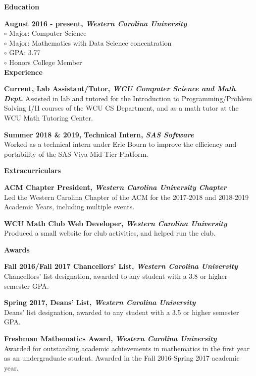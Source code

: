 \documentclass[a4paper,12pt,final]{memoir}
\newcommand{\Sep}{\vspace{1.5em}}
\newcommand{\SmallSep}{\vspace{0.5em}}
\newcommand{\CVSection}[1]
	{\Large\textbf{#1}\par
	\SmallSep\normalsize\normalfont}
\newcommand{\CVItem}[1]
	{\textbf{\color{RoyalBlue} #1}}
\begin{document}
\CVSection{Education}
\CVItem{August 2016 - present, \textit{Western Carolina University}}\\
{\color{RoyalBlue}$\circ$} Major: Computer Science \\
{\color{RoyalBlue}$\circ$} Major: Mathematics with Data Science concentration \\
{\color{RoyalBlue}$\circ$} GPA: 3.77 \\
{\color{RoyalBlue}$\circ$} Honors College Member \\

\CVSection{Experience}
\CVItem{Current, Lab Assistant/Tutor, \textit{WCU Computer Science and Math Dept.}}
Assisted in lab and tutored for the Introduction to Programming/Problem Solving I/II courses of the WCU CS Department, and as a math tutor at the WCU Math Tutoring Center.
\SmallSep

\CVItem{Summer 2018 \& 2019, Technical Intern, \textit{SAS Software}}\\
Worked as a technical intern under Eric Bourn to improve the efficiency and portability of the SAS Viya Mid-Tier Platform.
\Sep


\CVSection{Extracurriculars}
\CVItem{ACM Chapter President, \textit{Western Carolina University Chapter}}\\
Led the Western Carolina Chapter of the ACM for the 2017-2018 and 2018-2019 Academic Years, including multiple events.
\SmallSep

\CVItem{WCU Math Club Web Developer, \textit{Western Carolina University}}\\
Produced a small website for club activities, and helped run the club.

\Sep

\CVSection{Awards}
\CVItem{Fall 2016/Fall 2017 Chancellors' List, \textit{Western Carolina University}}\\
Chancellors' list designation, awarded to any student with a 3.8 or higher semester GPA.

\SmallSep

\CVItem{Spring 2017, Deans' List, \textit{Western Carolina University}}\\
Deans' list designation, awarded to any student with a 3.5 or higher semester GPA.

\SmallSep

\CVItem{Freshman Mathematics Award, \textit{Western Carolina University}}\\
Awarded for outstanding academic achievements in mathematics in the first year as an undergraduate student. Awarded in the Fall 2016-Spring 2017 academic year.
\end{document}
